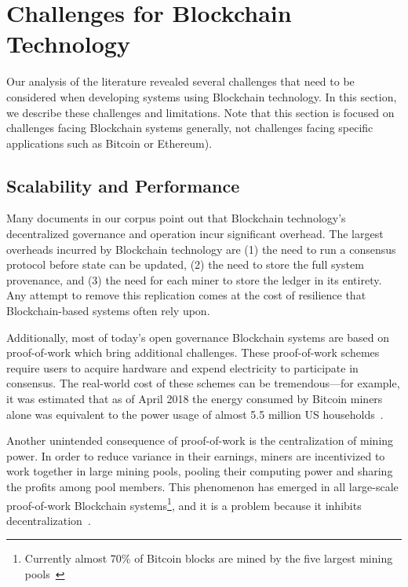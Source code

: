 \section{Challenges for Blockchain Technology}
\label{sec:challenges}

Our analysis of the literature revealed several challenges that need to be considered when developing systems using Blockchain technology.
In this section, we describe these challenges and limitations.
Note that this section is focused on challenges facing Blockchain systems generally, not challenges facing specific applications such as Bitcoin or Ethereum).

\subsection{Scalability and Performance}
Many documents in our corpus point out that Blockchain technology's decentralized governance and operation incur significant overhead. The largest overheads incurred by Blockchain technology are (1) the need to run a consensus protocol before state can be updated, (2) the need to store the full system provenance, and (3) the need for each miner to store the ledger in its entirety. Any attempt to remove this replication comes at the cost of resilience that Blockchain-based systems often rely upon.

Additionally, most of today's open governance Blockchain systems are based on proof-of-work which bring additional challenges.
These proof-of-work schemes require users to acquire hardware and expend electricity to participate in consensus.
The real-world cost of these schemes can be tremendous---for example, it was estimated that as of April 2018 the energy consumed by Bitcoin miners alone was equivalent to the power usage of almost 5.5 million US households~\cite{Digiconomist}.

Another unintended consequence of proof-of-work is the centralization of mining power.  In order to reduce variance in their earnings, miners are incentivized to work together in large mining pools, pooling their computing power and sharing the profits among pool members. This phenomenon has emerged in all large-scale proof-of-work Blockchain systems\footnote{Currently almost 70\% of Bitcoin blocks are mined by the five largest mining pools~\cite{BlockchainInfoPools}}, and it is a problem because it inhibits decentralization~\cite{arxiv:GBERS18}.

